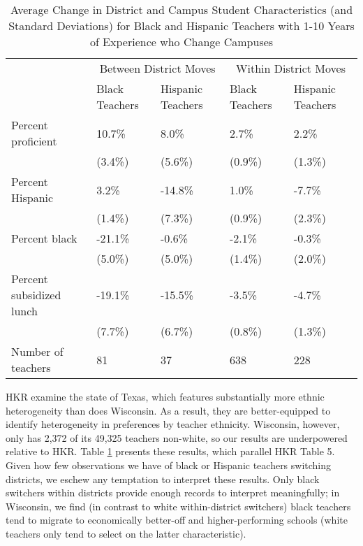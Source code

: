 \documentclass[12pt,]{article}
\begin{document}
\begin{table}[htbp]
\centering
\begin{tabular}{lp{}p{}p{}p{}}
  \hline
 & \multicolumn{2}{c}{Between District Moves} & \multicolumn{2}{c}{Within District Moves}\\ \cline{2-5}
 & Black Teachers & Hispanic Teachers & Black Teachers & Hispanic Teachers \\
  \hline
Percent proficient & 10.7\% & 8.0\% & 2.7\% & 2.2\% \\ 
   & (3.4\%) & (5.6\%) & (0.9\%) & (1.3\%) \\ 
  Percent Hispanic & 3.2\% & -14.8\% & 1.0\% & -7.7\% \\ 
   & (1.4\%) & (7.3\%) & (0.9\%) & (2.3\%) \\ 
  Percent black & -21.1\% & -0.6\% & -2.1\% & -0.3\% \\ 
   & (5.0\%) & (5.0\%) & (1.4\%) & (2.0\%) \\ 
  Percent subsidized lunch & -19.1\% & -15.5\% & -3.5\% & -4.7\% \\ 
   & (7.7\%) & (6.7\%) & (0.8\%) & (1.3\%) \\ 
  Number of teachers & 81 & 37 & 638 & 228 \\ 
   \hline
\end{tabular}
\caption{Average Change in District and Campus Student Characteristics (and Standard Deviations) for Black and Hispanic Teachers with 1-10 Years of Experience who Change Campuses} 
\label{tbl:change_by_eth}
\end{table}

HKR examine the state of Texas, which features substantially more ethnic
heterogeneity than does Wisconsin. As a result, they are better-equipped
to identify heterogeneity in preferences by teacher ethnicity.
Wisconsin, however, only has 2,372 of its 49,325 teachers non-white, so
our results are underpowered relative to HKR. Table
\ref{tbl:change_by_eth} presents these results, which parallel HKR Table
5. Given how few observations we have of black or Hispanic teachers
switching districts, we eschew any temptation to interpret these
results. Only black switchers within districts provide enough records to
interpret meaningfully; in Wisconsin, we find (in contrast to white
within-district switchers) black teachers tend to migrate to
economically better-off and higher-performing schools (white teachers
only tend to select on the latter characteristic).
\end{document}
